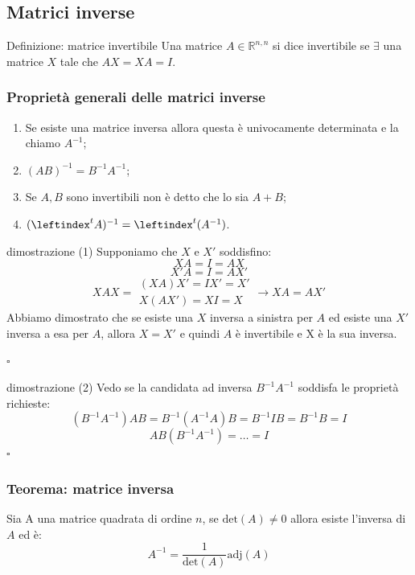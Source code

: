 \documentclass[x11names]{article}
\newcommand*{\QEDB}{\null\nobreak\hfill\ensuremath{\square}}%
\begin{document}
\subsection{Matrici inverse}
\begin{center}
\colorbox{myblue}{\begin{minipage}{5.75in}
\begin{blues}{Definizione: matrice invertibile}
    Una matrice $A \in \mathbb{R}^{n,n}$ si dice invertibile se $\exists$ una matrice $X$ tale che $AX = XA = I$.
\end{blues}
\end{minipage}}        
\end{center}
\subsubsection*{Proprietà generali delle matrici inverse}
\begin{enumerate}
    \item Se esiste una matrice inversa allora questa è univocamente determinata e la chiamo $A^{-1}$;
    \item $(AB)^{-1} = B^{-1}A^{-1}$;
    \item Se $A,B$ sono invertibili non è detto che lo sia $A+B$;
    \item $(\leftindex ^t{A})^{-1} = \leftindex ^t(A^{-1})$.
\end{enumerate}



\begin{es}{dimostrazione (1)}
Supponiamo che $X$ e $X'$ soddisfino:
$$
XA = I = AX 
$$
$$
X' A = I = AX'
$$
$$
XAX = \begin{array}{c}
       (XA)X' = IX' = X' \\
       X(AX') = XI = X
    \end{array}
    \rightarrow
    XA = AX'
$$
Abbiamo dimostrato che se esiste una $X$ inversa a sinistra per $A$ ed esiste una $X' $ inversa a esa per $A$, allora $X=X'$ e quindi $A$ è invertibile e X è la sua inversa. 

\QEDB
\end{es}
\begin{es}{dimostrazione (2)}
Vedo se la candidata ad inversa $B^{-1}A^{-1}$ soddisfa le proprietà richieste:
$$
(B^{-1}A^{-1})AB = B^{-1}(A^{-1}A)B = B^{-1}IB = B^{-1}B = I
$$
$$
AB(B^{-1}A^{-1})= \dots = I
$$
\QEDB
\end{es}

\begin{center}
	\colorbox{myred}{\begin{minipage}{5.75in}
			\begin{redes}{}
				\subsubsection{Teorema: matrice inversa}
			Sia A una matrice quadrata di ordine $n$, se $\text{det}(A) \neq 0$ allora esiste l’inversa di $A$ ed è:
			\[
			A^{-1} = \frac{1}{\text{det}(A)}\text{adj}(A)
			\]	
			\end{redes}
	\end{minipage}}        
\end{center}
\end{document}
